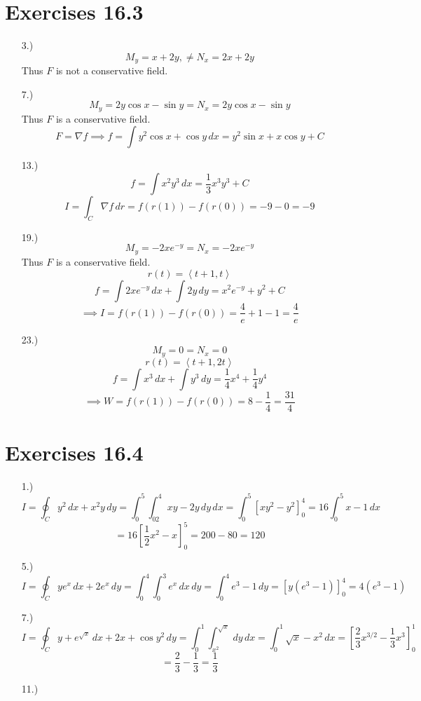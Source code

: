 \documentclass[12pt]{article}
\newcommand{\angleb}[1]{\left\langle#1\right\rangle}
\newcommand{\bracks}[1]{\left[#1\right]}
\begin{document}
\pagestyle{fancy}
\fancyhead{}

\normalsize
\section*{Exercises 16.3}
\begin{itemize}
    \item [3.)] \[M_y=x+2y,\ne N_x=2x+2y\]
    Thus $F$ is not a conservative field.

    \item [7.)] \[M_y=2y\cos x-\sin y=N_x=2y\cos x-\sin y\]
    Thus $F$ is a conservative field.
    \[F=\nabla f\implies f=\int y^2\cos x+\cos y\,dx=y^2\sin x+x\cos y+C\]

    \item [13.)] \[f=\int x^2y^3\,dx=\frac{1}{3}x^3y^3+C\]
    \[I=\int_C\nabla f\,dr=f(r(1))-f(r(0))=-9-0=-9\]

    \item [19.)] \[M_y=-2xe^{-y}=N_x=-2xe^{-y}\]
    Thus $F$ is a conservative field.
    \[r(t)=\angleb{t+1,t}\]
    \[f=\int2xe^{-y}\,dx+\int2y\,dy=x^2e^{-y}+y^2+C\]
    \[\implies I=f(r(1))-f(r(0))=\frac{4}{e}+1-1=\frac{4}{e}\]

    \item [23.)] \[M_y=0=N_x=0\]
    \[r(t)=\angleb{t+1,2t}\]
    \[f=\int x^3\,dx+\int y^3\,dy=\frac{1}{4}x^4+\frac{1}{4}y^4\]
    \[\implies W=f(r(1))-f(r(0))=8-\frac{1}{4}=\frac{31}{4}\]
\end{itemize}
\section*{Exercises 16.4}
\begin{itemize}
    \item [1.)] \[I=\oint_Cy^2\,dx+x^2y\,dy=\int^5_0\int^4_02xy-2y\,dy\,dx=\int^5_0\bracks{xy^2-y^2}^4_0=16\int^5_0x-1\,dx\]
    \[=16\bracks{\frac{1}{2}x^2-x}^5_0=200-80=120\]

    \item [5.)] \[I=\oint_Cye^x\,dx+2e^x\,dy=\int^4_0\int^3_0e^x\,dx\,dy=\int^4_0e^3-1\,dy=\bracks{y(e^3-1)}^4_0=4(e^3-1)\]

    \item [7.)] \[I=\oint_Cy+e^{\sqrt x}\,dx+2x+\cos y^2\,dy=\int^1_0\int^{\sqrt x}_{x^2}\,dy\,dx=\int^1_0\sqrt{x}-x^2\,dx=\bracks{\frac{2}{3}x^{3/2}-\frac{1}{3}x^3}^1_0\]
    \[=\frac{2}{3}-\frac{1}{3}=\frac{1}{3}\]

    \item [11.)]
\end{itemize}
\end{document}
